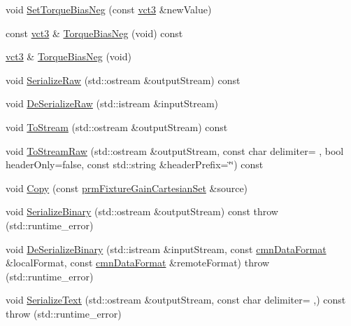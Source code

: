 \begin{DoxyCompactItemize}
void \hyperlink{classprm_fixture_gain_cartesian_set_a160f95d9776aaa96e34a2d57f911d433}{Set\+Torque\+Bias\+Neg} (const \hyperlink{vct_fixed_size_vector_types_8h_a3af82acdbf4eeb73c551909240b106ea}{vct3} \&new\+Value)
\item 
const \hyperlink{vct_fixed_size_vector_types_8h_a3af82acdbf4eeb73c551909240b106ea}{vct3} \& \hyperlink{classprm_fixture_gain_cartesian_set_a77c185549caac86bd5a02e4a42b026c0}{Torque\+Bias\+Neg} (void) const 
\item 
\hyperlink{vct_fixed_size_vector_types_8h_a3af82acdbf4eeb73c551909240b106ea}{vct3} \& \hyperlink{classprm_fixture_gain_cartesian_set_a2d0f913ec4c6d22bb31046109c647408}{Torque\+Bias\+Neg} (void)
\item 
void \hyperlink{classprm_fixture_gain_cartesian_set_a6221139d2e5b0ee3c8c2a1bda4094186}{Serialize\+Raw} (std\+::ostream \&output\+Stream) const 
\item 
void \hyperlink{classprm_fixture_gain_cartesian_set_a9f4d73e24a0faa4e0fe96bb9c966b2be}{De\+Serialize\+Raw} (std\+::istream \&input\+Stream)
\item 
void \hyperlink{classprm_fixture_gain_cartesian_set_a0d129371c093a24405c77f1f3824c7bd}{To\+Stream} (std\+::ostream \&output\+Stream) const 
\item 
void \hyperlink{classprm_fixture_gain_cartesian_set_ad1514250035188e3351aec2efcca7777}{To\+Stream\+Raw} (std\+::ostream \&output\+Stream, const char delimiter= \textquotesingle{} \textquotesingle{}, bool header\+Only=false, const std\+::string \&header\+Prefix=\char`\"{}\char`\"{}) const 
\item 
void \hyperlink{classprm_fixture_gain_cartesian_set_ad128945fdd592fbb136e3603f19e0075}{Copy} (const \hyperlink{classprm_fixture_gain_cartesian_set}{prm\+Fixture\+Gain\+Cartesian\+Set} \&source)
\item 
void \hyperlink{classprm_fixture_gain_cartesian_set_a34d5339a7baac6d8cfafd8dd91655651}{Serialize\+Binary} (std\+::ostream \&output\+Stream) const   throw (std\+::runtime\+\_\+error)
\item 
void \hyperlink{classprm_fixture_gain_cartesian_set_af4e721a09d67a583ff6691cf26a00ef0}{De\+Serialize\+Binary} (std\+::istream \&input\+Stream, const \hyperlink{classcmn_data_format}{cmn\+Data\+Format} \&local\+Format, const \hyperlink{classcmn_data_format}{cmn\+Data\+Format} \&remote\+Format)  throw (std\+::runtime\+\_\+error)
\item 
void \hyperlink{classprm_fixture_gain_cartesian_set_ab755fa6f1cbb829d19b17fffebdbb394}{Serialize\+Text} (std\+::ostream \&output\+Stream, const char delimiter= \textquotesingle{},\textquotesingle{}) const   throw (std\+::runtime\+\_\+error)

\end{DoxyCompactItemize}
